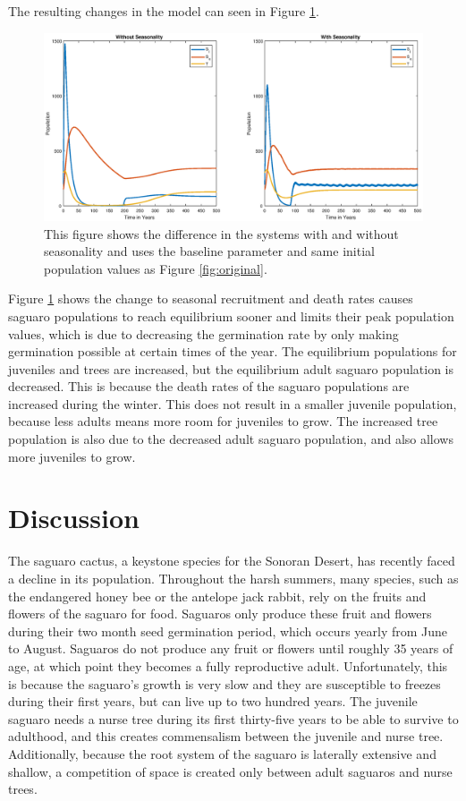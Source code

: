 \documentclass[a4paper]{article}
\begin{document}
The resulting changes in the model can seen in Figure \ref{fig:WithAndWithoutSeasonality}.
\begin{figure}[H]
\centering
\includegraphics[scale = 0.45]{withAndWithoutSeasonality.eps}
\caption{This figure shows the difference in the systems with and without seasonality and uses the baseline parameter and same initial population values as Figure \ref{fig:original}.}
\label{fig:WithAndWithoutSeasonality}
\end{figure}
Figure \ref{fig:WithAndWithoutSeasonality} shows the change to seasonal recruitment and death rates causes saguaro populations to reach equilibrium sooner and limits their peak population values, which is due to decreasing the germination rate by only making germination possible at certain times of the year. The equilibrium populations for juveniles and trees are increased, but the equilibrium adult saguaro population is decreased. This is because the death rates of the saguaro populations are increased during the winter. This does not result in a smaller juvenile population, because less adults means more room for juveniles to grow. The increased tree population is also due to the decreased adult saguaro population, and also allows more juveniles to grow.
\section{Discussion}

The saguaro cactus, a keystone species for the Sonoran Desert, has recently faced a decline in its population. Throughout the harsh summers, many species, such as the endangered honey bee or the antelope jack rabbit, rely on the fruits and flowers of the saguaro for food. Saguaros only produce these fruit and flowers during their two month seed germination period, which occurs yearly from June to August. Saguaros do not produce any fruit or flowers until roughly 35 years of age, at which point they becomes a fully reproductive adult. Unfortunately, this is because the saguaro's growth is very slow and they are susceptible to freezes during their first years, but can live up to two hundred years. The juvenile saguaro needs a nurse tree during its first thirty-five years to be able to survive to adulthood, and this creates commensalism between the juvenile and nurse tree. Additionally, because the root system of the saguaro is laterally extensive and shallow, a competition of space is created only between adult saguaros and nurse trees.\\
\end{document}
